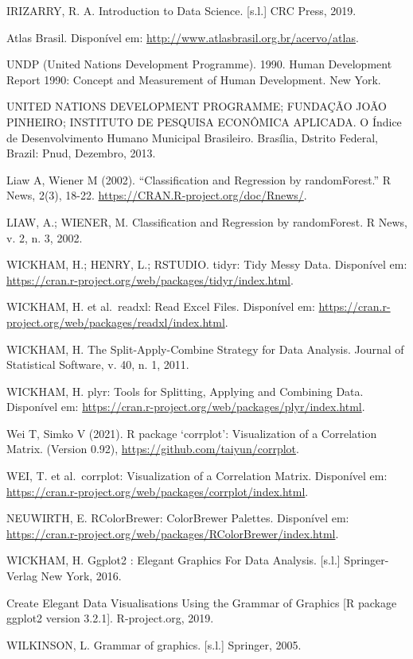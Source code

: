 \documentclass[
]{article}
\begin{document}
IRIZARRY, R. A. Introduction to Data Science. {[}s.l.{]} CRC Press,
2019.

Atlas Brasil. Disponível em:
\url{http://www.atlasbrasil.org.br/acervo/atlas}.

UNDP (United Nations Development Programme). 1990. Human Development
Report 1990: Concept and Measurement of Human Development. New York.

UNITED NATIONS DEVELOPMENT PROGRAMME; FUNDAÇÃO JOÃO PINHEIRO; INSTITUTO
DE PESQUISA ECONÔMICA APLICADA. O Índice de Desenvolvimento Humano
Municipal Brasileiro. Brasília, Dstrito Federal, Brazil: Pnud, Dezembro,
2013.

Liaw A, Wiener M (2002). ``Classification and Regression by
randomForest.'' R News, 2(3), 18-22.
\url{https://CRAN.R-project.org/doc/Rnews/}.

LIAW, A.; WIENER, M. Classification and Regression by randomForest. R
News, v. 2, n. 3, 2002.

WICKHAM, H.; HENRY, L.; RSTUDIO. tidyr: Tidy Messy Data. Disponível em:
\url{https://cran.r-project.org/web/packages/tidyr/index.html}.

WICKHAM, H. et al.~readxl: Read Excel Files. Disponível em:
\url{https://cran.r-project.org/web/packages/readxl/index.html}.

WICKHAM, H. The Split-Apply-Combine Strategy for Data Analysis. Journal
of Statistical Software, v. 40, n. 1, 2011.

WICKHAM, H. plyr: Tools for Splitting, Applying and Combining Data.
Disponível em:
\url{https://cran.r-project.org/web/packages/plyr/index.html}.

Wei T, Simko V (2021). R package `corrplot': Visualization of a
Correlation Matrix. (Version 0.92),
\url{https://github.com/taiyun/corrplot}.

WEI, T. et al.~corrplot: Visualization of a Correlation Matrix.
Disponível em:
\url{https://cran.r-project.org/web/packages/corrplot/index.html}.

NEUWIRTH, E. RColorBrewer: ColorBrewer Palettes. Disponível em:
\url{https://cran.r-project.org/web/packages/RColorBrewer/index.html}.

WICKHAM, H. Ggplot2 : Elegant Graphics For Data Analysis. {[}s.l.{]}
Springer-Verlag New York, 2016.

Create Elegant Data Visualisations Using the Grammar of Graphics {[}R
package ggplot2 version 3.2.1{]}. R-project.org, 2019.

WILKINSON, L. Grammar of graphics. {[}s.l.{]} Springer, 2005.
\end{document}
